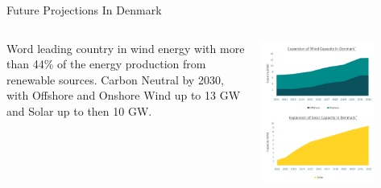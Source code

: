 \documentclass[aspectratio=169,hyperref={pdfpagelabels=false}]{beamer}
\begin{document}
\begin{frame}{\Large{Future Projections In Denmark}}

        \begin{columns}
          \begin{column}{0.4\textwidth}
            Word leading country in wind energy with more than 44\% of the energy production from renewable sources.
            Carbon Neutral by 2030, with Offshore and Onshore Wind up to 13 GW and Solar up to then 10 GW.
            
          \end{column}
      
          \begin{column}{0.5\textwidth}
            \includegraphics[width=0.75\textwidth]{img/pic2.png} 
          \end{column}
        \end{columns}
        \let\thefootnote\relax{}
      \end{frame}
\end{document}
